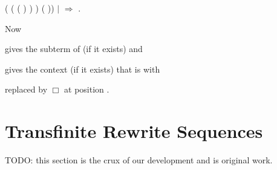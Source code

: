 \begin{singlespace}
\begin{coqdoccode}
(
(
 (
) )
)\coqdoceol
\coqdocindent{14.00em}
\coqdoceol
\coqdocindent{14.00em}
( 
))\coqdoceol
\coqdocindent{7.00em}
\coqdoceol
\coqdocindent{5.00em}
\ensuremath{|}
\coqdocvar{\_} \ensuremath{\Rightarrow}
\coqdoceol
\coqdocindent{5.00em}
\coqdoceol
\coqdocindent{3.00em}
\coqdoceol
\coqdocindent{1.00em}
.\coqdoceol
\end{coqdoccode}
\end{singlespace}
Now \begin{coqdoccode}
   \end{coqdoccode} gives the
subterm of  (if it exists)
and \begin{coqdoccode}
   \end{coqdoccode} gives the
context  (if it exists) that is 
with \begin{coqdoccode}
   \end{coqdoccode} replaced by
$\Box$ at position .


\section{Transfinite Rewrite Sequences}\label{sec:seq}

TODO: this section is the crux of our development and is original work.

